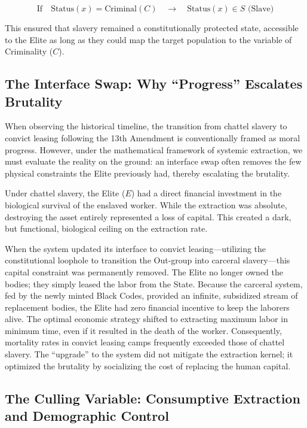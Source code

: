 \documentclass[12pt,openany]{book}
\begin{document}
\[
\text{If} \quad \text{Status}(x) = \text{Criminal}(C) \quad \rightarrow \quad \text{Status}(x) \in S \text{ (Slave)}
\]

This ensured that slavery remained a constitutionally protected state, accessible to the Elite as long as they could map the target population to the variable of Criminality ($C$).

\subsection{The Interface Swap: Why ``Progress'' Escalates Brutality}

When observing the historical timeline, the transition from chattel slavery to convict leasing following the 13th Amendment is conventionally framed as moral progress. However, under the mathematical framework of systemic extraction, we must evaluate the reality on the ground: an interface swap often removes the few physical constraints the Elite previously had, thereby escalating the brutality.

Under chattel slavery, the Elite ($E$) had a direct financial investment in the biological survival of the enslaved worker. While the extraction was absolute, destroying the asset entirely represented a loss of capital. This created a dark, but functional, biological ceiling on the extraction rate.

When the system updated its interface to convict leasing---utilizing the constitutional loophole to transition the Out-group into carceral slavery---this capital constraint was permanently removed. The Elite no longer owned the bodies; they simply leased the labor from the State. Because the carceral system, fed by the newly minted Black Codes, provided an infinite, subsidized stream of replacement bodies, the Elite had zero financial incentive to keep the laborers alive. The optimal economic strategy shifted to extracting maximum labor in minimum time, even if it resulted in the death of the worker. Consequently, mortality rates in convict leasing camps frequently exceeded those of chattel slavery. The ``upgrade'' to the system did not mitigate the extraction kernel; it optimized the brutality by socializing the cost of replacing the human capital.

\subsection{The Culling Variable: Consumptive Extraction and Demographic Control}
\end{document}
